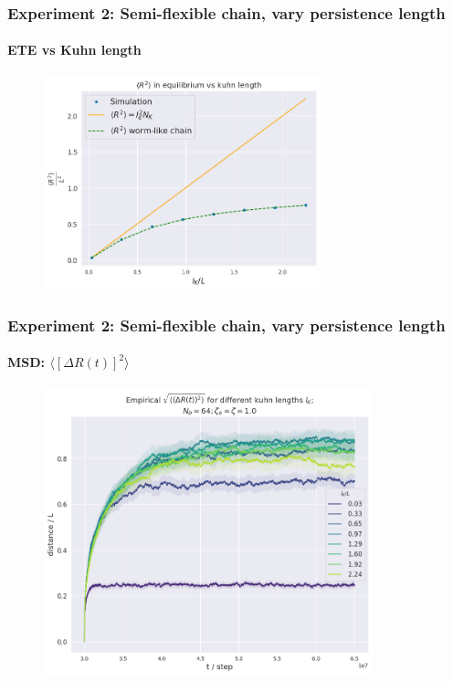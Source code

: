 \documentclass[handout]{beamer}
\newcommand{\mean}[1]{\langle #1 \rangle}
\begin{document}
\begin{frame}
    \frametitle{Experiment 2: Semi-flexible chain, vary persistence length}
    \framesubtitle{ETE vs Kuhn length}

    \begin{figure}[h]
        \includegraphics[width=8cm]{./4-exp-R_sim_vs_theor.png}
    \end{figure}
\end{frame}


\begin{frame}
    \frametitle{Experiment 2: Semi-flexible chain, vary persistence length}
    \framesubtitle{MSD: $\mean{[\Delta R(t)]^2}$}

    \begin{figure}[h]
        \includegraphics[width=9.5cm]{./4-exp-delta_R-bare.png}
    \end{figure}
\end{frame}
\end{document}

